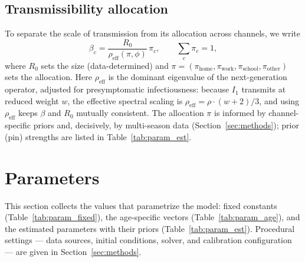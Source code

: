 \documentclass[12pt]{article}
\theoremstyle{plain}
\theoremstyle{remark}
\theoremstyle{definition}
\begin{document}
\subsection{Transmissibility allocation}
\label{sec:reparam}
To separate the scale of transmission from its allocation across channels, we write
\begin{equation}
\beta_c = \frac{R_0}{\rho_{\mathrm{eff}}(\pi,\phi)}\,\pi_c,
\qquad \textstyle\sum_c \pi_c = 1,
\end{equation}
where $R_0$ sets the size (data-determined) and $\pi = (\pi_{\mathrm{home}}, \pi_{\mathrm{work}}, \pi_{\mathrm{school}}, \pi_{\mathrm{other}})$ sets the allocation. Here $\rho_{\mathrm{eff}}$ is the dominant eigenvalue of the next-generation operator, adjusted for presymptomatic infectiousness: because $I_1$ transmits at reduced weight $w$, the effective spectral scaling is $\rho_{\mathrm{eff}} = \rho\cdot(w+2)/3$, and using $\rho_{\mathrm{eff}}$ keeps $\beta$ and $R_0$ mutually consistent. The allocation $\pi$ is informed by channel-specific priors and, decisively, by multi-season data (Section~\ref{sec:methods}); prior (pin) strengths are listed in Table~\ref{tab:param_est}.

\section{Parameters}
\label{sec:parameters}
This section collects the values that parametrize the model: fixed constants (Table~\ref{tab:param_fixed}), the age-specific vectors (Table~\ref{tab:param_age}), and the estimated parameters with their priors (Table~\ref{tab:param_est}). Procedural settings --- data sources, initial conditions, solver, and calibration configuration --- are given in Section~\ref{sec:methods}.
\end{document}
